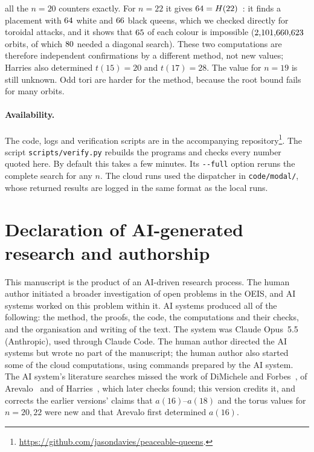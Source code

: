 \documentclass[11pt]{article}
\theoremstyle{remark}
\begin{document}
\begin{itemize}
all the $n=20$ counters exactly. For $n=22$ it gives $64=H(22)$~\cite[Table~1]{Harries}: it finds a placement with
$64$ white and $66$ black queens, which we checked directly for toroidal
attacks, and it shows that $65$ of each colour is impossible ($2{,}101{,}660{,}623$
orbits, of which $80$ needed a diagonal search). These two computations are
therefore independent confirmations by a different method, not new values; Harries also determined
$t(15)=20$ and $t(17)=28$. The value for $n=19$ is still
unknown. Odd tori are harder for the method, because the root bound fails for many orbits.
\end{itemize}

\paragraph{Availability.} The code, logs and verification scripts are in the accompanying
repository\footnote{\url{https://github.com/jasondavies/peaceable-queens}.}. The script
\texttt{scripts/verify.py} rebuilds the programs and checks every number quoted here. By default this
takes a few minutes. Its \texttt{-{}-full} option reruns the complete search for any $n$. The cloud runs used
the dispatcher in \texttt{code/modal/}, whose returned results are logged in the same format as the local
runs.

\section*{Declaration of AI-generated research and authorship}
This manuscript is the product of an AI-driven research process. The human author initiated a broader
investigation of open problems in the OEIS, and AI systems worked on this problem within it. AI systems
produced all of the following: the method, the proofs, the code, the computations and their checks, and
the organisation and writing of the text. The system was Claude Opus~5.5 (Anthropic), used through
Claude Code. The human author directed the AI systems but wrote no part of the
manuscript; the human author also started some of the cloud computations, using commands prepared by
the AI system.
The AI system's literature searches missed the work of DiMichele and Forbes~\cite{DF}, of
Arevalo~\cite{Arevalo} and of Harries~\cite{Harries}, which later checks found; this version credits it,
and corrects the earlier versions' claims that $a(16)$--$a(18)$ and the torus values for $n=20,22$ were
new and that Arevalo first determined $a(16)$.
\end{document}
